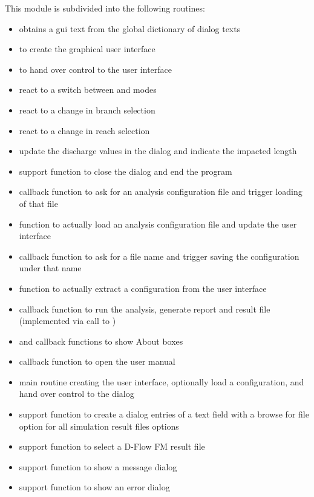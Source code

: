 This module is subdivided into the following routines:

\begin{itemize}
\item {} obtains a gui text from the global dictionary of dialog texts
\item {} to create the graphical user interface
\item {} to hand over control to the user interface
\item {} react to a switch between  and  modes
\item {} react to a change in branch selection
\item {} react to a change in reach selection
\item {} update the discharge values in the dialog and indicate the impacted length
\item {} support function to close the dialog and end the program
\item {} callback function to ask for an analysis configuration file and trigger loading of that file
\item {} function to actually load an analysis configuration file and update the user interface
\item {} callback function to ask for a file name and trigger saving the configuration under that name
\item {} function to actually extract a configuration from the user interface
\item {} callback function to run the analysis, generate report and result file (implemented via call to )
\item {} and  callback functions to show About boxes
\item {} callback function to open the user manual
\item {} main routine creating the user interface, optionally load a configuration, and hand over control to the dialog

\item {} support function to create a dialog entries of a text field with a browse for file option for all simulation result files options
\item {} support function to select a D-Flow FM result file
\item {} support function to show a message dialog
\item {} support function to show an error dialog
\end{itemize}


